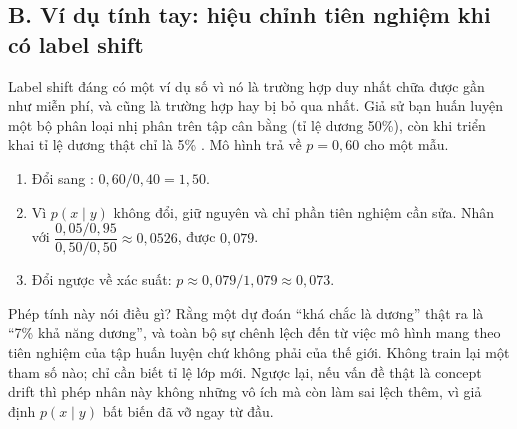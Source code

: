 \documentclass[../../deep_learning.tex]{subfiles}
\begin{document}
\subsection{B. Ví dụ tính tay: hiệu chỉnh tiên nghiệm khi có label shift}
Label shift đáng có một ví dụ số vì nó là trường hợp duy nhất chữa được gần như miễn phí, và cũng là trường hợp hay bị bỏ qua nhất. Giả sử bạn huấn luyện một bộ phân loại nhị phân trên tập cân bằng (tỉ lệ dương 50\%), còn khi triển khai tỉ lệ dương thật chỉ là 5\%
. Mô hình trả về \(p = 0{,}60\) cho một mẫu.
\begin{enumerate}
\item Đổi sang : \(0{,}60/0{,}40 = 1{,}50\).
\item Vì \(p(x \mid y)\) không đổi,  giữ nguyên và chỉ phần tiên nghiệm cần sửa. Nhân với \(\dfrac{0{,}05/0{,}95}{0{,}50/0{,}50} \approx 0{,}0526\), được \(0{,}079\).
\item Đổi ngược về xác suất: \(p \approx 0{,}079/1{,}079 \approx 0{,}073\).
\end{enumerate}
Phép tính này nói điều gì? Rằng một dự đoán ``khá chắc là dương'' thật ra là ``7\%
khả năng dương'', và toàn bộ sự chênh lệch đến từ việc mô hình mang theo tiên nghiệm của tập huấn luyện chứ không phải của thế giới. Không train lại một tham số nào; chỉ cần biết tỉ lệ lớp mới. Ngược lại, nếu vấn đề thật là concept drift thì phép nhân này không những vô ích mà còn làm sai lệch thêm, vì giả định \(p(x\mid y)\) bất biến đã vỡ ngay từ đầu.
\end{document}
